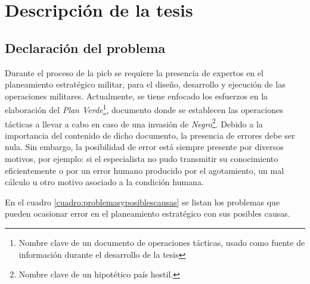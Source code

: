 \chapter{Descripción de la tesis}



\section{Declaración del problema}

Durante el proceso de la \gls{picb} se requiere la presencia de expertos en el planeamiento estratégico militar, para el diseño, desarrollo y ejecución de las operaciones militares. Actualmente, se tiene enfocado los esfuerzos en la elaboración del \emph{Plan Verde}\footnote{Nombre clave de un documento de operaciones tácticas, usado como fuente de información durante el desarrollo de la tesis}, documento donde se establecen las operaciones tácticas a llevar a cabo en caso de una invasión de \emph{Negro}\footnote{Nombre clave de un hipotético país hostil.}. Debido a la importancia del contenido de dicho documento, la presencia de errores debe ser nula. Sin embargo, la posibilidad de error está siempre presente por diversos motivos, por ejemplo: si el especialista no pudo transmitir su conocimiento eficientemente o por un error humano producido por el agotamiento, un mal cálculo u otro motivo asociado a la condición humana.

En el cuadro \ref{cuadro:problemasyposiblescausas} se listan los problemas que pueden ocasionar error en el planeamiento estratégico con sus posibles causas.

